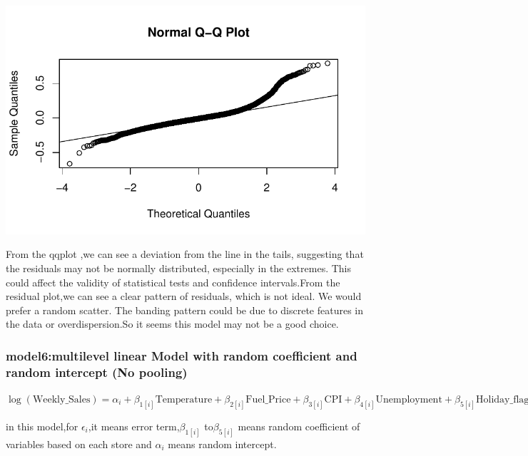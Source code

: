 \documentclass[
  letterpaper,
  DIV=11,
  numbers=noendperiod]{scrartcl}
\begin{document}
\includegraphics{678final_files/figure-pdf/unnamed-chunk-14-2.pdf}

From the qqplot ,we can see a deviation from the line in the tails,
suggesting that the residuals may not be normally distributed,
especially in the extremes. This could affect the validity of
statistical tests and confidence intervals.From the residual plot,we can
see a clear pattern of residuals, which is not ideal. We would prefer a
random scatter. The banding pattern could be due to discrete features in
the data or overdispersion.So it seems this model may not be a good
choice.

\hypertarget{model6multilevel-linear-model-with-random-coefficient-and-random-intercept-no-pooling}{%
\subsubsection{model6:multilevel linear Model with random coefficient
and random intercept (No
pooling)}\label{model6multilevel-linear-model-with-random-coefficient-and-random-intercept-no-pooling}}

\(\log(\text{Weekly_Sales}) = \alpha_{i} + \beta_{1[i]}\text{Temperature} + \beta_{2[i]}\text{Fuel_Price} + \beta_{3[i]}\text{CPI} + \beta_{4[i]}\text{Unemployment} + \beta_{5[i]}\text{Holiday_flag}+\epsilon_i\)

in this model,for \(\epsilon_i\),it means error term,\(\beta_{1[i]}\)
to\(\beta_{5[i]}\) means random coefficient of variables based on each
store and \(\alpha_{i}\) means random intercept.
\end{document}
